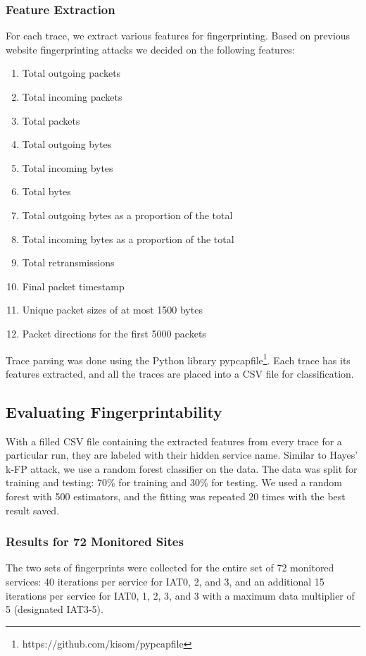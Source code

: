 \documentclass[11pt]{article}
\begin{document}
\subsubsection{Feature Extraction}
For each trace, we extract various features for fingerprinting.
Based on previous website fingerprinting attacks we decided on the following features:
\begin{enumerate}
    \item Total outgoing packets
    \item Total incoming packets
    \item Total packets
    \item Total outgoing bytes
    \item Total incoming bytes
    \item Total bytes
    \item Total outgoing bytes as a proportion of the total
    \item Total incoming bytes as a proportion of the total
    \item Total retransmissions
    \item Final packet timestamp
    \item Unique packet sizes of at most 1500 bytes
    \item Packet directions for the first 5000 packets
\end{enumerate}
Trace parsing was done using the Python library pypcapfile\footnote{https://github.com/kisom/pypcapfile}. Each trace has its features extracted, and all the traces are placed into a CSV file for classification.

\subsection{Evaluating Fingerprintability}
With a filled CSV file containing the extracted features from every trace for a particular run, they are labeled with their hidden service name. Similar to Hayes' k-FP attack\cite{hayes}, we use a random forest classifier on the data. The data was split for training and testing: 70\% for training and 30\% for testing. We used a random forest with 500 estimators, and the fitting was repeated 20 times with the best result saved.

\subsubsection{Results for 72 Monitored Sites}
The two sets of fingerprints were collected for the entire set of 72 monitored services: 40 iterations per service for IAT0, 2, and 3, and an additional 15 iterations per service for IAT0, 1, 2, 3, and 3 with a maximum data multiplier of 5 (designated IAT3-5).
\end{document}
